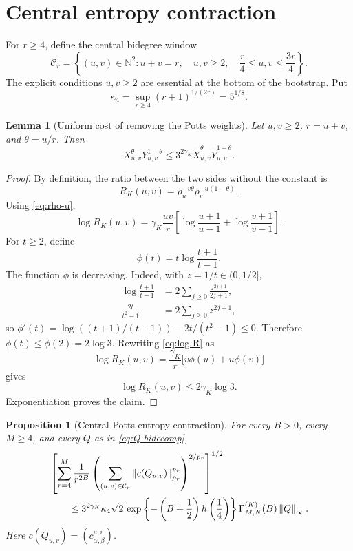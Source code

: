 \documentclass[11pt]{article}
\newtheorem{proposition}[theorem]{Proposition}
\newtheorem{lemma}[theorem]{Lemma}
\theoremstyle{definition}
\theoremstyle{remark}
\newcommand{\N}{\mathbb{N}}
\newcommand{\norm}[1]{\left\lVert #1\right\rVert}
\begin{document}
\section{Central entropy contraction}

For $r\ge4$, define the central bidegree window
\begin{equation}
\label{eq:Cr}
 \mathcal C_r=
 \left\{(u,v)\in\N^2:
 u+v=r,\quad u,v\ge2,\quad
 \frac r4\le u,v\le\frac{3r}{4}
 \right\}.
\end{equation}
The explicit conditions $u,v\ge2$ are essential at the bottom of the
bootstrap.  Put
\begin{equation}
\label{eq:kappa4}
 \kappa_4=\sup_{r\ge4}(r+1)^{1/(2r)}=5^{1/8}.
\end{equation}

\begin{lemma}[Uniform cost of removing the Potts weights]
\label{lem:potts-cost}
Let $u,v\ge2$, $r=u+v$, and $\theta=u/r$.  Then
\begin{equation}
\label{eq:potts-cost}
 X_{u,v}^{\theta}Y_{u,v}^{1-\theta}
 \le3^{2\gamma_K}
 \widetilde X_{u,v}^{\theta}
 \widetilde Y_{u,v}^{1-\theta}.
\end{equation}
\end{lemma}

\begin{proof}
By definition, the ratio between the two sides without the constant is
\[
 R_K(u,v)
 =\rho_u^{-v\theta}\rho_v^{-u(1-\theta)}.
\]
Using \eqref{eq:rho-u},
\begin{equation}
\label{eq:log-R}
 \log R_K(u,v)
 =\gamma_K\frac{uv}{r}
 \left[
  \log\frac{u+1}{u-1}
  +\log\frac{v+1}{v-1}
 \right].
\end{equation}
For $t\ge2$, define
\[
 \phi(t)=t\log\frac{t+1}{t-1}.
\]
The function $\phi$ is decreasing.  Indeed, with $z=1/t\in(0,1/2]$,
\begin{align*}
 \log\frac{t+1}{t-1}
 &=2\sum_{j\ge0}\frac{z^{2j+1}}{2j+1},\\
 \frac{2t}{t^2-1}
 &=2\sum_{j\ge0}z^{2j+1},
\end{align*}
so
$\phi'(t)=\log((t+1)/(t-1))-2t/(t^2-1)\le0$.
Therefore $\phi(t)\le\phi(2)=2\log3$.  Rewriting
\eqref{eq:log-R} as
\[
 \log R_K(u,v)
 =\frac{\gamma_K}{r}\bigl[v\phi(u)+u\phi(v)\bigr]
\]
gives
\[
 \log R_K(u,v)\le2\gamma_K\log3.
\]
Exponentiation proves the claim.
\end{proof}

\begin{proposition}[Central Potts entropy contraction]
\label{prop:central}
For every $B>0$, every $M\ge4$, and every $Q$ as in
\eqref{eq:Q-bidecomp},
\begin{align}
&\left[
 \sum_{r=4}^M\frac1{r^{2B}}
 \left(
  \sum_{(u,v)\in\mathcal C_r}
  \norm{c(Q_{u,v})}_{p_r}^{p_r}
 \right)^{2/p_r}
\right]^{1/2}
\notag\\
&\qquad\le
3^{2\gamma_K}\kappa_4\sqrt2\,
\exp\left\{-\left(B+\frac12\right)
 h\left(\frac14\right)\right\}
\Gamma^{(K)}_{M,N}(B)\norm Q_\infty.
\label{eq:central}
\end{align}
Here $c(Q_{u,v})=(c^{u,v}_{\alpha,\beta})$.
\end{proposition}
\end{document}
